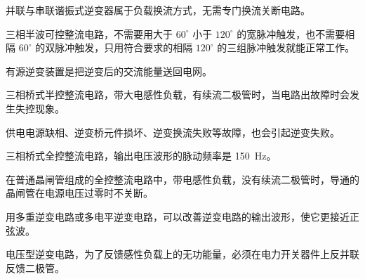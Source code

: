 \documentclass[电力电子]{subfiles}
\begin{document}
	\begin{ti}
		并联与串联谐振式逆变器属于负载换流方式，无需专门换流关断电路。\cuo
	\end{ti}

	\begin{ti}
		三相半波可控整流电路，不需要用大于 $60^\circ$ 小于 $120^\circ$ 的宽脉冲触发，也不需要相隔 $60^\circ$ 的双脉冲触发，只用符合要求的相隔 $120^\circ$ 的三组脉冲触发就能正常工作。\dui
	\end{ti}

	\begin{ti}
		有源逆变装置是把逆变后的交流能量送回电网。\dui
	\end{ti}

	\begin{ti}
		三相桥式半控整流电路，带大电感性负载，有续流二极管时，当电路出故障时会发生失控现象。\cuo
	\end{ti}

	\begin{ti}
		供电电源缺相、逆变桥元件损坏、逆变换流失败等故障，也会引起逆变失败。\dui
	\end{ti}

	\begin{ti}
		三相桥式全控整流电路，输出电压波形的脉动频率是 \SI{150}{Hz}。\cuo
	\end{ti}

	\begin{ti}
		在普通晶闸管组成的全控整流电路中，带电感性负载，没有续流二极管时，导通的晶闸管在电源电压过零时不关断。\dui
	\end{ti}

	\begin{ti}
		用多重逆变电路或多电平逆变电路，可以改善逆变电路的输出波形，使它更接近正弦波。\dui
	\end{ti}

	\begin{ti}
		电压型逆变电路，为了反馈感性负载上的无功能量，必须在电力开关器件上反并联反馈二极管。\dui
	\end{ti}
\end{document}
